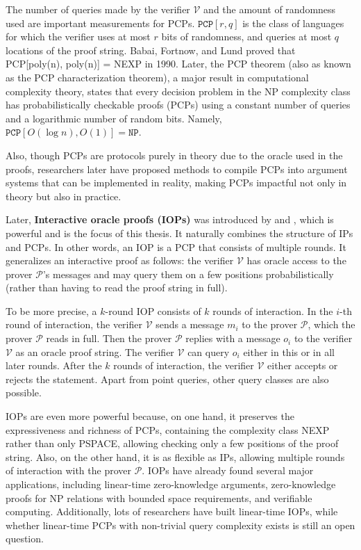 The number of queries made by the verifier $\mathcal{V}$ and the amount of randomness used are important measurements for PCPs. $\texttt{PCP}[r, q]$ is the class of languages for which the verifier uses at most $r$ bits of randomness, and queries at most $q$ locations of the proof string.
Babai, Fortnow, and Lund \cite{DBLP:conf/focs/BabaiFL90} proved that PCP[poly(n), poly(n)] = NEXP in 1990. 
Later, the PCP theorem (also as known as the PCP characterization theorem), 
a major result in computational complexity theory, 
states that every decision problem in the NP complexity class has probabilistically checkable proofs (PCPs) using a constant number of queries and a logarithmic number of random bits.
Namely, $\texttt{PCP}[O(\log n), O(1)] = \texttt{NP}$.

Also, though PCPs are protocols purely in theory due to the oracle used in the proofs, researchers later have proposed methods \cite{DBLP:conf/stoc/Kilian92} to compile PCPs into argument systems that can be implemented in reality, making PCPs impactful not only in theory but also in practice. 

Later, \textbf{Interactive oracle proofs (IOPs)} was introduced by \cite{DBLP:conf/tcc/Ben-SassonCS16} and \cite{DBLP:journals/jacm/KalaiRR22}, which is powerful and is the focus of this thesis. It naturally combines the structure of IPs and PCPs.
In other words, an IOP is a PCP that consists of multiple rounds. It generalizes an interactive proof as follows:
the verifier $\mathcal{V}$ has oracle access to the prover $\mathcal{P}$’s messages and may query them on a few positions probabilistically (rather than having to read the proof string in full). 

To be more precise, a $k$-round IOP consists of $k$ rounds of interaction. In the $i$-th round of interaction, the verifier $\mathcal{V}$ sends a message $m_i$ to the prover $\mathcal{P}$, which the prover $\mathcal{P}$ reads in full. 
Then the prover $\mathcal{P}$ replies with a message $o_i$ to the verifier $\mathcal{V}$ as an oracle proof string.
The verifier $\mathcal{V}$ can query $o_i$ either in this or in all later rounds. 
After the $k$ rounds of interaction, the verifier $\mathcal{V}$ either accepts or rejects the statement.
Apart from point queries, other query classes are also possible.

IOPs are even more powerful because, on one hand, it preserves the expressiveness and richness of PCPs, containing the complexity class NEXP rather than only PSPACE, allowing checking only a few positions of the proof string. Also, on the other hand, it is as flexible as IPs, allowing multiple rounds of interaction with the prover $\mathcal{P}$. IOPs have already found several major applications, including linear-time zero-knowledge arguments, zero-knowledge proofs for NP relations with bounded space requirements, and verifiable computing.
Additionally, lots of researchers have built linear-time IOPs, while whether linear-time PCPs with non-trivial query complexity exists is still an open question.


